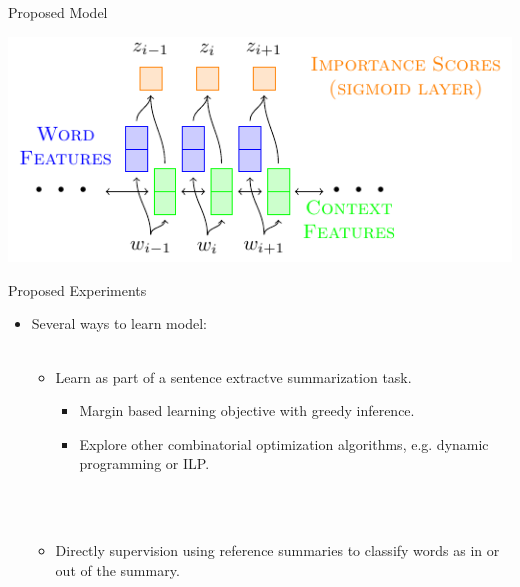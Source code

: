 \begin{frame}{Proposed Model}
    \begin{center}
    \includegraphics[scale=1.3]{3_deep_learning_models_of_salience/image_texs/wimp/wimp.pdf}

\end{center}




\end{frame}

\begin{frame}{Proposed Experiments}
\begin{itemize}
   \item<1-> Several ways to learn model:
           ~\\~\\
   \begin{itemize} 
     \item<2-> Learn as part of a sentence extractve summarization task.
     \begin{itemize}
        \item<3-> Margin based learning objective with greedy inference.
        \item<4-> Explore other combinatorial optimization algorithms, e.g. dynamic programming or ILP.
     \end{itemize}~\\~\\
     \item<5-> Directly supervision using reference summaries to classify words
     as in or out of the summary.
   \end{itemize}


\end{itemize}
\end{frame}

